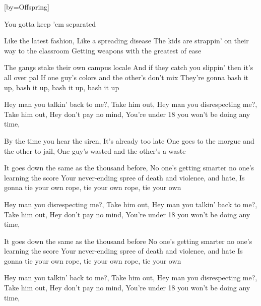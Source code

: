  

[by=Offspring]




\beginchorus
You gotta keep 'em separated
\endchorus

\beginverse
Like the latest fashion, \brk  Like a spreading disease
The kids are strappin' on their way to the classroom
Getting weapons with the greatest of ease

The gangs stake their own campus locale
And if they catch you slippin' then it's all over pal
If one guy's colors and the other's don't mix
They're gonna bash it up, bash it up, bash it up, bash it up
\endverse

\beginchorus
Hey man you talkin' back to me?, \brk  Take him out, \brk  {}
Hey man you disrespecting me?, \brk  Take him out, \brk  {}
Hey don't pay no mind, \brk  You're under 18 you won't be doing any time, \brk  {}
\endchorus

\beginverse
By the time you hear the siren, \brk  It's already too late
One goes to the morgue and the other to jail, \brk  One guy's wasted and the other's a waste

It goes down the same as the thousand before, \brk  No one's getting smarter no one's learning the score
Your never-ending spree of death and violence, and hate, \brk  Is gonna tie your own rope, tie your own rope, tie your own
\endverse

\beginchorus
Hey man you disrespecting me?, \brk  Take him out, \brk  {}
Hey man you talkin' back to me?, \brk  Take him out, \brk  {}
Hey don't pay no mind, \brk  You're under 18 you won't be doing any time, \brk  {}
\endchorus

\beginverse
It goes down the same as the thousand before
No one's getting smarter no one's learning the score
Your never-ending spree of death and violence, and hate
Is gonna tie your own rope, tie your own rope, tie your own
\endverse

\beginchorus
Hey man you talkin' back to me?, \brk  Take him out, \brk  {}
Hey man you disrespecting me?, \brk  Take him out, \brk  {}
Hey don't pay no mind, \brk  You're under 18 you won't be doing any time, \brk  {}
\endchorus


\endsong

